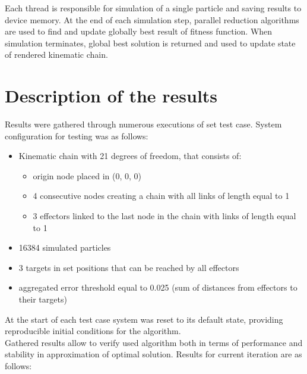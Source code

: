 \documentclass[]{report}
\begin{document}
\noindent Each thread is responsible for simulation of a single particle and saving results to device memory. At the end of each simulation step, parallel reduction algorithms are used to find and update globally best result of fitness function. When simulation terminates, global best solution is returned and used to update state of rendered kinematic chain.

\chapter*{Description of the results}

\noindent Results were gathered through numerous executions of set test case. System configuration for testing was as follows:

\begin{itemize}
	\item Kinematic chain with 21 degrees of freedom, that consists of:
	\begin{itemize}
		\item origin node placed in (0, 0, 0)
		\item 4 consecutive nodes creating a chain with all links of length equal to 1
		\item 3 effectors linked to the last node in the chain with links of length equal to 1
	\end{itemize}
	\item 16384 simulated particles
	\item 3 targets in set positions that can be reached by all effectors
	\item aggregated error threshold equal to 0.025 (sum of distances from effectors to their targets)
\end{itemize}

\noindent At the start of each test case system was reset to its default state, providing reproducible initial conditions for the algorithm.\\

\noindent Gathered results allow to verify used algorithm both in terms of performance and 
stability in approximation of optimal solution. Results for current iteration are as follows:
\end{document}
